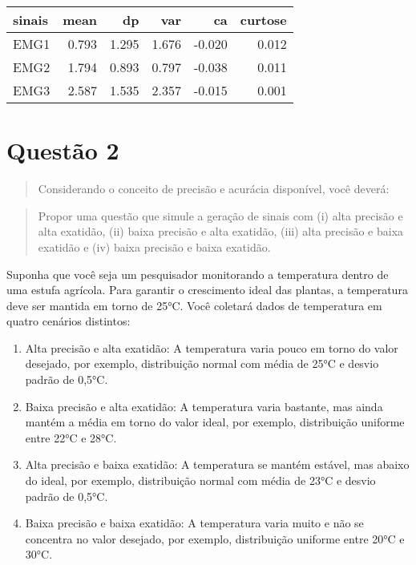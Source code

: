 \documentclass[
]{article}
\begin{document}
\begin{table}
\centering
\begin{tabular}[t]{l|r|r|r|r|r}
\hline
sinais & mean & dp & var & ca & curtose\\
\hline
EMG1 & 0.793 & 1.295 & 1.676 & -0.020 & 0.012\\
\hline
EMG2 & 1.794 & 0.893 & 0.797 & -0.038 & 0.011\\
\hline
EMG3 & 2.587 & 1.535 & 2.357 & -0.015 & 0.001\\
\hline
\end{tabular}
\end{table}

\newpage
\section*{Questão 2}

\begin{quote}
Considerando o conceito de precisão e acurácia disponível, você deverá:
\end{quote}

\begin{quote}
Propor uma questão que simule a geração de sinais com (i) alta precisão
e alta exatidão, (ii) baixa precisão e alta exatidão, (iii) alta
precisão e baixa exatidão e (iv) baixa precisão e baixa exatidão.
\end{quote}

Suponha que você seja um pesquisador monitorando a temperatura dentro de
uma estufa agrícola. Para garantir o crescimento ideal das plantas, a
temperatura deve ser mantida em torno de 25°C. Você coletará dados de
temperatura em quatro cenários distintos:

\begin{enumerate}
\def\labelenumi{\arabic{enumi}.}
\item
  Alta precisão e alta exatidão: A temperatura varia pouco em torno do
  valor desejado, por exemplo, distribuição normal com média de 25°C e
  desvio padrão de 0,5°C.
\item
  Baixa precisão e alta exatidão: A temperatura varia bastante, mas
  ainda mantém a média em torno do valor ideal, por exemplo,
  distribuição uniforme entre 22°C e 28°C.
\item
  Alta precisão e baixa exatidão: A temperatura se mantém estável, mas
  abaixo do ideal, por exemplo, distribuição normal com média de 23°C e
  desvio padrão de 0,5°C.
\item
  Baixa precisão e baixa exatidão: A temperatura varia muito e não se
  concentra no valor desejado, por exemplo, distribuição uniforme entre
  20°C e 30°C.
\end{enumerate}
\end{document}
